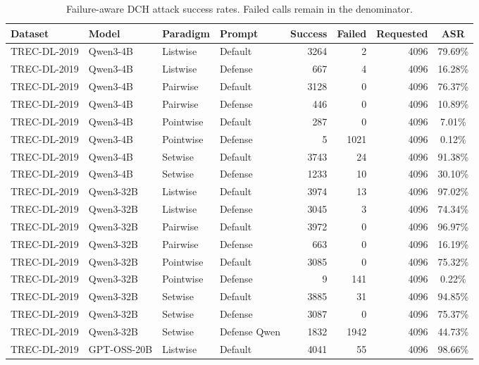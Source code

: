 \begin{table}[t]
\centering
\small
\setlength{\tabcolsep}{4pt}
\caption{Failure-aware DCH attack success rates. Failed calls remain in the denominator.}
\label{tab:attack-failure-aware-dch}
\begin{tabular}{ll l l r r r c}
\toprule
\textbf{Dataset} & \textbf{Model} & \textbf{Paradigm} & \textbf{Prompt} & \textbf{Success} & \textbf{Failed} & \textbf{Requested} & \textbf{ASR} \\
\midrule
TREC-DL-2019 & Qwen3-4B & Listwise & Default & 3264 & 2 & 4096 & 79.69\% \\
TREC-DL-2019 & Qwen3-4B & Listwise & Defense & 667 & 4 & 4096 & 16.28\% \\
TREC-DL-2019 & Qwen3-4B & Pairwise & Default & 3128 & 0 & 4096 & 76.37\% \\
TREC-DL-2019 & Qwen3-4B & Pairwise & Defense & 446 & 0 & 4096 & 10.89\% \\
TREC-DL-2019 & Qwen3-4B & Pointwise & Default & 287 & 0 & 4096 & 7.01\% \\
TREC-DL-2019 & Qwen3-4B & Pointwise & Defense & 5 & 1021 & 4096 & 0.12\% \\
TREC-DL-2019 & Qwen3-4B & Setwise & Default & 3743 & 24 & 4096 & 91.38\% \\
TREC-DL-2019 & Qwen3-4B & Setwise & Defense & 1233 & 10 & 4096 & 30.10\% \\
TREC-DL-2019 & Qwen3-32B & Listwise & Default & 3974 & 13 & 4096 & 97.02\% \\
TREC-DL-2019 & Qwen3-32B & Listwise & Defense & 3045 & 3 & 4096 & 74.34\% \\
TREC-DL-2019 & Qwen3-32B & Pairwise & Default & 3972 & 0 & 4096 & 96.97\% \\
TREC-DL-2019 & Qwen3-32B & Pairwise & Defense & 663 & 0 & 4096 & 16.19\% \\
TREC-DL-2019 & Qwen3-32B & Pointwise & Default & 3085 & 0 & 4096 & 75.32\% \\
TREC-DL-2019 & Qwen3-32B & Pointwise & Defense & 9 & 141 & 4096 & 0.22\% \\
TREC-DL-2019 & Qwen3-32B & Setwise & Default & 3885 & 31 & 4096 & 94.85\% \\
TREC-DL-2019 & Qwen3-32B & Setwise & Defense & 3087 & 0 & 4096 & 75.37\% \\
TREC-DL-2019 & Qwen3-32B & Setwise & Defense Qwen & 1832 & 1942 & 4096 & 44.73\% \\
TREC-DL-2019 & GPT-OSS-20B & Listwise & Default & 4041 & 55 & 4096 & 98.66\% \\

\end{tabular}
\end{table}
